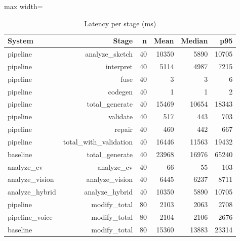 \begin{table}[t]
\centering
\scriptsize
\caption{Latency per stage (ms)}
\label{tab:latency}
\setlength{\tabcolsep}{3.5pt}
\begin{adjustbox}{max width=\columnwidth}
\begin{tabular}{lrrrrr}
\toprule
\textbf{System} & \textbf{Stage} & \textbf{n} & \textbf{Mean} & \textbf{Median} & \textbf{p95} \\
\midrule
pipeline & analyze\_sketch & 40 & 10350 & 5890 & 10705 \\
pipeline & interpret & 40 & 5114 & 4987 & 7215 \\
pipeline & fuse & 40 & 3 & 3 & 6 \\
pipeline & codegen & 40 & 1 & 1 & 2 \\
pipeline & total\_generate & 40 & 15469 & 10654 & 18343 \\
pipeline & validate & 40 & 517 & 443 & 703 \\
pipeline & repair & 40 & 460 & 442 & 667 \\
pipeline & total\_with\_validation & 40 & 16446 & 11563 & 19432 \\
baseline & total\_generate & 40 & 23968 & 16976 & 65240 \\
analyze\_cv & analyze\_cv & 40 & 66 & 55 & 103 \\
analyze\_vision & analyze\_vision & 40 & 6445 & 6237 & 8711 \\
analyze\_hybrid & analyze\_hybrid & 40 & 10350 & 5890 & 10705 \\
pipeline & modify\_total & 80 & 2103 & 2063 & 2708 \\
pipeline\_voice & modify\_total & 80 & 2104 & 2106 & 2676 \\
baseline & modify\_total & 80 & 15360 & 13883 & 23314 \\
\bottomrule
\end{tabular}
\end{adjustbox}
\end{table}

